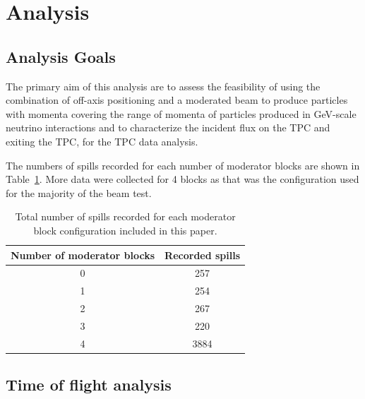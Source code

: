 \section{Analysis}
\label{hptpcPaper:sec:Analysis}
\subsection{Analysis Goals}

The primary aim of this analysis are to assess the feasibility of using the combination of off-axis positioning and a moderated beam to produce particles with momenta covering the range of momenta of particles produced in GeV-scale neutrino interactions and to characterize the incident flux on the TPC and exiting the TPC, for the TPC data analysis.

The numbers of spills recorded for each number of moderator blocks are shown in Table~\ref{tab:spills}.
More data were collected for 4 blocks as that was the configuration used for the majority of the beam test.

\begin{table}
  \centering
  \caption{Total number of spills recorded for each moderator block configuration included in this paper.}
  \begin{tabular}{c|c}
    \hline
    \hline
    Number of moderator blocks & Recorded spills \\
    \hline
    0 & 257 \\
    1 & 254 \\
    2 & 267 \\
    3 & 220 \\
    4 & 3884 \\
    \hline
  \end{tabular}
  \label{tab:spills}
\end{table}


\subsection{Time of flight analysis}
\label{timeofflightanalysissubsec}


